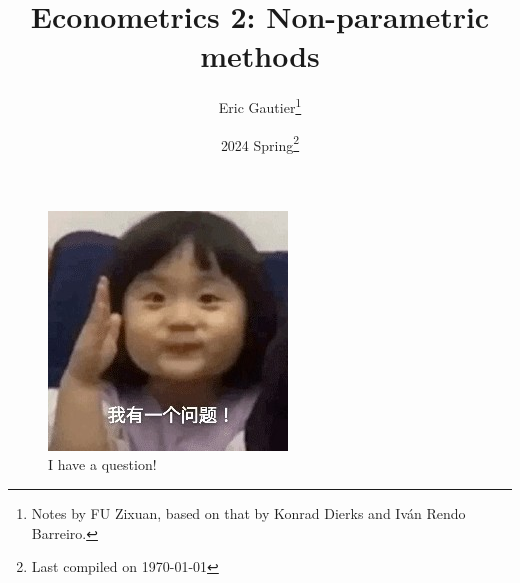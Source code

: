 \documentclass[12pt]{article}
\title{Econometrics 2: Non-parametric methods }
\author{Eric Gautier\thanks{Notes by FU Zixuan, based on that by Konrad Dierks and Iván Rendo Barreiro.}}
\date{2024 Spring\thanks{Last compiled on \today}}
\begin{document}
\maketitle

\begin{figure}[h]
    \centering
    \includegraphics{figures/ihaveaquestion.jpg}
    \caption*{I have a question!}
\end{figure}

\newpage
\tableofcontents
\newpage
















\newpage
\end{document}
